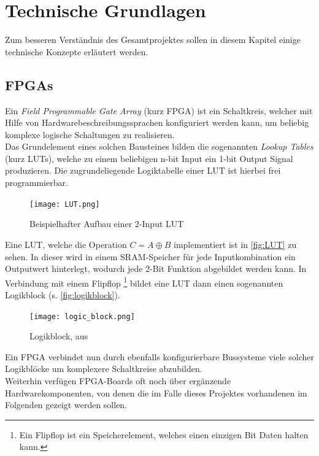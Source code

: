 \documentclass[a4paper,12pt,onesided]{report}
\begin{document}
\chapter{Technische Grundlagen}
Zum besseren Verständnis des Gesamtprojektes sollen in diesem Kapitel einige technische Konzepte erläutert werden.

\section{FPGAs}
\label{sec:fpga}
Ein \textit{Field Programmable Gate Array} (kurz FPGA) ist ein Schaltkreis, welcher mit Hilfe von Hardwarebeschreibungssprachen %
konfiguriert werden kann, um beliebig komplexe logische Schaltungen zu realisieren.\\
Das Grundelement eines solchen Bausteines bilden die sogenannten \textit{Lookup Tables} (kurz LUTs), welche zu einem beliebigen n-bit Input ein 1-bit Output Signal produzieren. Die zugrundeliegende Logiktabelle einer LUT ist hierbei frei programmierbar.

\begin{figure}[H]
	\centering
	\texttt{[image: LUT.png]}
	\caption{Beispielhafter Aufbau einer 2-Input LUT}
	\label{fig:LUT}
\end{figure}

Eine LUT, welche die Operation $C = A \oplus B$ implementiert ist in \autoref{fig:LUT} zu sehen. In dieser wird in einem SRAM-Speicher für jede Inputkombination ein Outputwert hinterlegt, wodurch jede 2-Bit Funktion abgebildet werden kann. In Verbindung mit einem Flipflop \footnote{Ein Flipflop ist ein Speicherelement, welches einen einzigen Bit Daten halten kann.} bildet eine LUT dann einen sogenannten Logikblock (s. \autoref{fig:logikblock}).\cite{fpgaDesign}

\begin{figure}[H]
	\centering
	\texttt{[image: logic\_block.png]}
	\caption{Logikblock, aus \cite{fpgaDesign}}
	\label{fig:logikblock}
\end{figure}

Ein FPGA verbindet nun durch ebenfalls konfigurierbare Bussysteme viele solcher Logikblöcke um komplexere Schaltkreise abzubilden.\\
Weiterhin verfügen FPGA-Boards oft noch über ergänzende Hardwarekomponenten, von denen die im Falle dieses Projektes vorhandenen im Folgenden gezeigt werden sollen.
\end{document}
